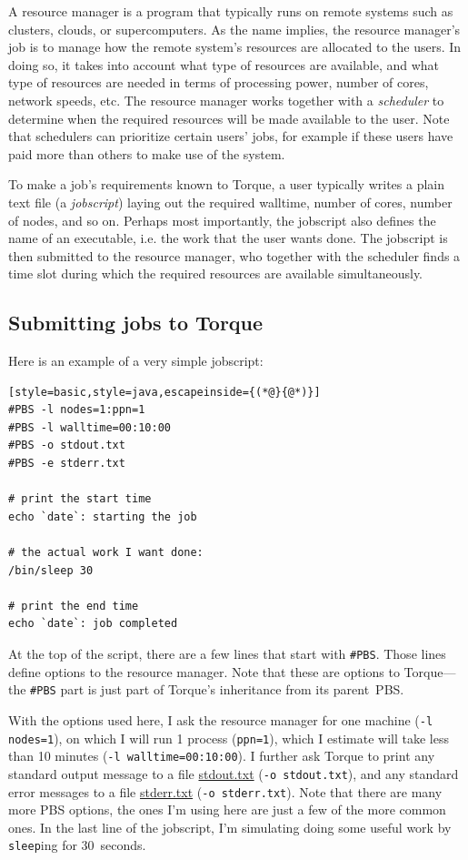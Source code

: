 \documentclass[12pt, a4paper, twoside, openany, titlepage]{book}
\begin{document}
A resource manager is a program that typically runs on remote systems such as clusters, clouds, or supercomputers. As the name implies, the resource manager's job is to manage how the remote system's resources are allocated to the users. In doing so, it takes into account what type of resources are available, and what type of resources are needed in terms of processing power, number of cores, network speeds, etc. The resource manager works together with a \textit{scheduler} to determine when the required resources will be made available to the user. Note that schedulers can prioritize certain users' jobs, for example if these users have paid more than others to make use of the system.

To make a job's requirements known to Torque, a user typically writes a plain text file (a \textit{jobscript}) laying out the required walltime, number of cores, number of nodes, and so on. Perhaps most importantly, the jobscript also defines the name of an executable, i.e. the work that the user wants done. The jobscript is then submitted to the resource manager, who together with the scheduler finds a time slot during which the required resources are available simultaneously.

\clearpage
\subsection{Submitting jobs to Torque}

Here is an example of a very simple jobscript:
\begin{lstlisting}[style=basic,style=java,escapeinside={(*@}{@*)}]
#PBS -l nodes=1:ppn=1
#PBS -l walltime=00:10:00
#PBS -o stdout.txt
#PBS -e stderr.txt

# print the start time
echo `date`: starting the job

# the actual work I want done:
/bin/sleep 30

# print the end time
echo `date`: job completed
\end{lstlisting}


At the top of the script, there are a few lines that start with \texttt{\#PBS}. Those lines define options to the resource manager. Note that these are options to Torque---the \texttt{\#PBS} part is just part of Torque's inheritance from its parent~PBS.

With the options used here, I ask the resource manager for one machine \mbox{(\texttt{-l nodes=1})}, on which I will run 1 process (\texttt{ppn=1}), which I estimate will take less than 10 minutes (\texttt{-l walltime=00:10:00}). I further ask Torque to print any standard output message to a file \url{stdout.txt} (\texttt{-o stdout.txt}), and any standard error messages to a file \url{stderr.txt} (\texttt{-o stderr.txt}). Note that there are many more PBS options, the ones I'm using here are just a few of the more common ones. In the last line of the jobscript, I'm simulating doing some useful work by \texttt{sleep}ing for 30~seconds.
\end{document}
